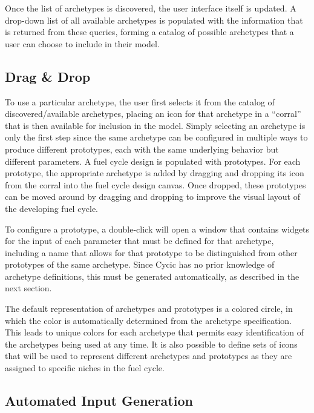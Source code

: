 Once the list of archetypes is discovered, the user interface itself is
updated.  A drop-down list of all available archetypes is populated with the
information that is returned from these queries, forming a catalog of possible
archetypes that a user can choose to include in their model.

\subsection{Drag \& Drop}

To use a particular archetype, the user first selects it from the catalog of
discovered/available archetypes, placing an icon for that archetype in a
``corral'' that is then available for inclusion in the model.  Simply
selecting an archetype is only the first step since the same archetype can be
configured in multiple ways to produce different prototypes, each with the
same underlying behavior but different parameters.  A fuel cycle design is
populated with prototypes. For each prototype, the appropriate archetype is
added by dragging and dropping its icon from the corral into the fuel cycle
design canvas.  Once dropped, these prototypes can be moved around by dragging
and dropping to improve the visual layout of the developing fuel cycle.

To configure a prototype, a double-click will open a window that contains
widgets for the input of each parameter that must be defined for that
archetype, including a name that allows for that prototype to be distinguished
from other prototypes of the same archetype.  Since Cycic has no prior
knowledge of archetype definitions, this must be generated automatically, as
described in the next section.

The default representation of archetypes and prototypes is a colored circle,
in which the color is automatically determined from the archetype
specification.  This leads to unique colors for each archetype that permits
easy identification of the archetypes being used at any time.  It is also
possible to define sets of icons that will be used to represent different
archetypes and prototypes as they are assigned to specific niches in the fuel
cycle.

\subsection{Automated Input Generation}

